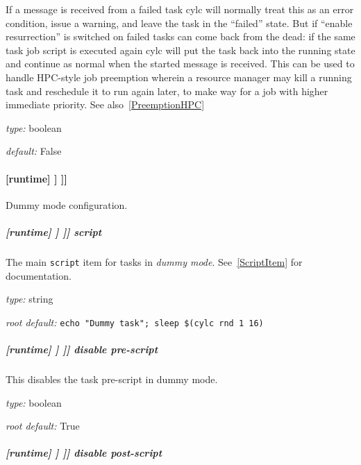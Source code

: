 If a message is received from a failed task cylc will normally treat
this as an error condition, issue a warning, and leave the task in the
``failed'' state.  But if ``enable resurrection'' is switched on failed
tasks can come back from the dead: if the same task job script is
executed again cylc will put the task back into the running state and
continue as normal when the started message is received. This can be
used to handle HPC-style job preemption wherein a resource manager may
kill a running task and reschedule it to run again later, to make way
for a job with higher immediate priority. See also~\ref{PreemptionHPC}
\begin{myitemize}
\item {\em type:} boolean
\item {\em default:} False
\end{myitemize}


\paragraph[{[[[}dummy mode{]]]}]{[runtime] \textrightarrow [[\_\_NAME\_\_]] \textrightarrow [[[dummy mode]]]}

Dummy mode configuration.

\subparagraph[script]{[runtime] \textrightarrow [[\_\_NAME\_\_]] \textrightarrow [[[dummy mode]]] \textrightarrow script}

The main \lstinline=script= item for tasks in {\em dummy mode}.
See~\ref{ScriptItem} for documentation.

\begin{myitemize}
\item {\em type:} string
\item {\em root default:} \lstinline=echo "Dummy task"; sleep $(cylc rnd 1 16)=
\end{myitemize}

\subparagraph[disable pre-script]{[runtime] \textrightarrow [[\_\_NAME\_\_]] \textrightarrow [[[dummy mode]]] \textrightarrow disable pre-script}

This disables the task pre-script in dummy mode.

\begin{myitemize}
\item {\em type:} boolean
\item {\em root default:} True
\end{myitemize}

\subparagraph[disable post-script]{[runtime] \textrightarrow [[\_\_NAME\_\_]] \textrightarrow [[[dummy mode]]] \textrightarrow disable post-script}

